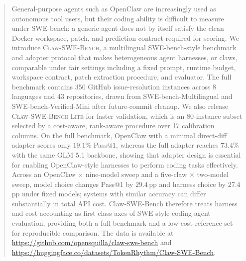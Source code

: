 \begin{abstract}
General-purpose agents such as OpenClaw are increasingly used as autonomous tool users, but their coding ability is difficult to measure under SWE-bench: a generic agent does not by itself satisfy the clean Docker workspace, patch, and prediction contract required for scoring. We introduce \textsc{Claw-SWE-Bench}, a multilingual SWE-bench-style benchmark and adapter protocol that makes heterogeneous agent harnesses, or claws, comparable under fair settings including a fixed prompt, runtime budget, workspace contract, patch extraction procedure, and evaluator. The full benchmark contains 350 GitHub issue-resolution instances across 8 languages and 43 repositories, drawn from SWE-bench-Multilingual and SWE-bench-Verified-Mini after future-commit cleanup. We also release \textsc{Claw-SWE-Bench Lite} for faster validation, which is an 80-instance subset selected by a cost-aware, rank-aware procedure over 17 calibration columns. On the full benchmark, OpenClaw with a minimal direct-diff adapter scores only $19.1\%$ Pass@1, whereas the full adapter reaches $73.4\%$ with the same GLM 5.1 backbone, showing that adapter design is essential for enabling OpenClaw-style harnesses to perform coding tasks effectively. Across an OpenClaw $\times$ nine-model sweep and a five-claw $\times$ two-model sweep, model choice changes Pass@1 by $29.4$\,pp and harness choice by $27.4$\,pp under fixed models; systems with similar accuracy can differ substantially in total API cost. Claw-SWE-Bench therefore treats harness and cost accounting as first-class axes of SWE-style coding-agent evaluation, providing both a full benchmark and a low-cost reference set for reproducible comparison.
The data is available at \url{https://github.com/opensquilla/claw-swe-bench} and \url{https://huggingface.co/datasets/TokenRhythm/Claw-SWE-Bench}.


\end{abstract}
